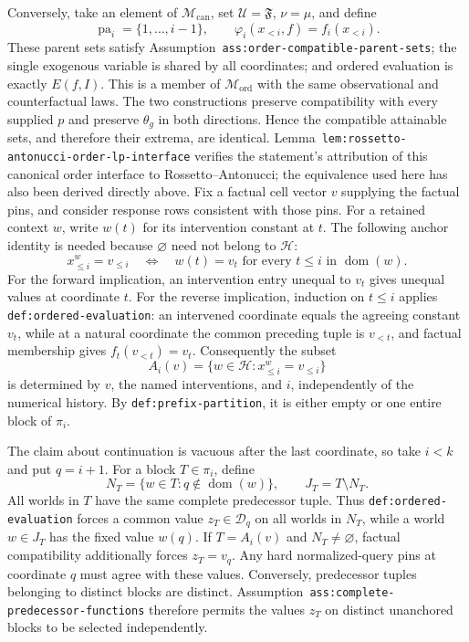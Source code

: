 Conversely, take an element of \(\mathcal M_{\mathrm{can}}\), set \(\mathcal U=\mathfrak F\), \(\nu=\mu\), and define
\[
 \operatorname{pa}_i=\{1,\ldots,i-1\},
 \qquad
 \varphi_i(x_{<i},f)=f_i(x_{<i}).
\]
These parent sets satisfy Assumption~\texttt{ass:order-compatible-parent-sets}; the single exogenous variable is shared by all coordinates; and ordered evaluation is exactly \(E(f,I)\). This is a member of \(\mathcal M_{\mathrm{ord}}\) with the same observational and counterfactual laws. The two constructions preserve compatibility with every supplied \(p\) and preserve \(\theta_g\) in both directions. Hence the compatible attainable sets, and therefore their extrema, are identical. Lemma~\texttt{lem:rossetto-antonucci-order-lp-interface} verifies the statement's attribution of this canonical order interface to Rossetto--Antonucci; the equivalence used here has also been derived directly above.
Fix a factual cell vector \(v\) supplying the factual pins, and consider response rows consistent with those pins. For a retained context \(w\), write \(w(t)\) for its intervention constant at \(t\). The following anchor identity is needed because \(\varnothing\) need not belong to \(\mathcal H\):
\[
 x^w_{\leq i}=v_{\leq i}
 \quad\Longleftrightarrow\quad
 w(t)=v_t\text{ for every }t\leq i\text{ in }\operatorname{dom}(w).
 \tag{1}
\]
For the forward implication, an intervention entry unequal to \(v_t\) gives unequal values at coordinate \(t\). For the reverse implication, induction on \(t\leq i\) applies \texttt{def:ordered-evaluation}: an intervened coordinate equals the agreeing constant \(v_t\), while at a natural coordinate the common preceding tuple is \(v_{<t}\), and factual membership gives \(f_t(v_{<t})=v_t\). Consequently the subset
\[
 A_i(v)=\{w\in\mathcal H:x^w_{\leq i}=v_{\leq i}\}
\]
is determined by \(v\), the named interventions, and \(i\), independently of the numerical history. By \texttt{def:prefix-partition}, it is either empty or one entire block of \(\pi_i\).

The claim about continuation is vacuous after the last coordinate, so take \(i<k\) and put \(q=i+1\). For a block \(T\in\pi_i\), define
\[
 N_T=\{w\in T:q\notin\operatorname{dom}(w)\},
 \qquad
 J_T=T\setminus N_T.
\]
All worlds in \(T\) have the same complete predecessor tuple. Thus \texttt{def:ordered-evaluation} forces a common value \(z_T\in\mathcal D_q\) on all worlds in \(N_T\), while a world \(w\in J_T\) has the fixed value \(w(q)\). If \(T=A_i(v)\) and \(N_T\neq\varnothing\), factual compatibility additionally forces \(z_T=v_q\). Any hard normalized-query pins at coordinate \(q\) must agree with these values. Conversely, predecessor tuples belonging to distinct blocks are distinct. Assumption~\texttt{ass:complete-predecessor-functions} therefore permits the values \(z_T\) on distinct unanchored blocks to be selected independently.

